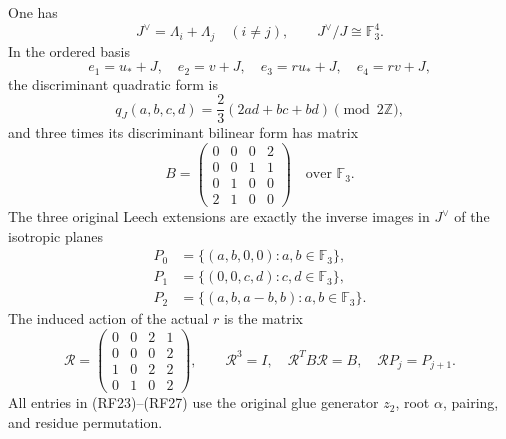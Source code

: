 \begin{theorem}
\label{esrf:thm:discriminant-correspondence}
One has
\[
 J^\vee=\Lambda_i+\Lambda_j\quad(i\ne j),\qquad
 J^\vee/J\cong\mathbb F_3^4.
 \tag{RF22}
\]
In the ordered basis
\[
 e_1=u_*+J,\quad e_2=v+J,\quad
 e_3=ru_*+J,\quad e_4=rv+J,
 \tag{RF23}
\]
the discriminant quadratic form is
\[
 q_J(a,b,c,d)=\frac23(2ad+bc+bd)\pmod{2\mathbb Z},
 \tag{RF24}
\]
and three times its discriminant bilinear form has matrix
\[
 B=
 \begin{pmatrix}
 0&0&0&2\\0&0&1&1\\0&1&0&0\\2&1&0&0
 \end{pmatrix}\quad\text{over }\mathbb F_3.
 \tag{RF25}
\]
The three original Leech extensions are exactly the inverse
images in $J^\vee$ of the isotropic planes
\[
 \begin{split}
 P_0&=\{(a,b,0,0):a,b\in\mathbb F_3\},\\
 P_1&=\{(0,0,c,d):c,d\in\mathbb F_3\},\\
 P_2&=\{(a,b,a-b,b):a,b\in\mathbb F_3\}.
 \end{split}
 \tag{RF26}
\]
The induced action of the actual $r$ is the matrix
\[
 \mathcal R=
 \begin{pmatrix}
 0&0&2&1\\
 0&0&0&2\\
 1&0&2&2\\
 0&1&0&2
 \end{pmatrix},\qquad
 \mathcal R^3=I,\quad \mathcal R^TB\mathcal R=B,
 \quad\mathcal R P_j=P_{j+1}.
 \tag{RF27}
\]
All entries in (RF23)--(RF27) use the original glue generator
$z_2$, root $\alpha$, pairing, and residue permutation.
\end{theorem}

